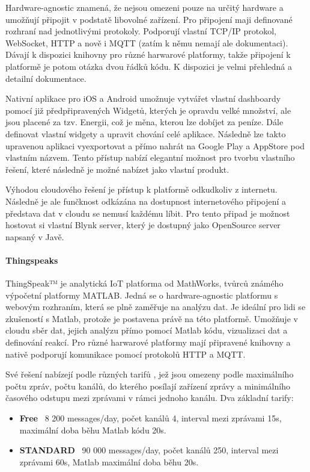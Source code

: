 Hardware-agnostic znamená, že nejsou omezeni pouze na určitý hardware a umožňují připojit v podstatě libovolné zařízení. Pro připojení maji definované rozhraní nad jednotlivými protokoly. Podporují vlastní TCP/IP protokol, WebSocket, HTTP a nově i MQTT (zatím k němu nemají ale dokumentaci). Dávají k dispozici knihovny pro různé harwarové platformy, takže připojení k platformě je potom otázka dvou řádků kódu. K dispozici je velmi přehledná a detailní dokumentace. \cite{blynk-doc}

Nativní aplikace pro iOS a Android umožnuje vytvářet vlastní dashboardy pomocí již předpřipravených Widgetů, kterých je opravdu velké množství, ale jsou placené za tzv. Energii, což je měna, kterou lze dobíjet za peníze. Dále definovat vlastní widgety a upravit chování celé aplikace. Následně lze takto upravenou aplikaci vyexportovat a přímo nahrát na Google Play a AppStore pod vlastním názvem. Tento přístup nabízí elegantní možnost pro tvorbu vlastního řešení, které následně je možné nabízet jako vlastní produkt. \cite{blynk}

Výhodou cloudového řešení je přístup k platformě odkudkoliv z internetu. Následně je ale funčknost odkázána na dostupnost internetového připojení a představa dat v cloudu se nemusí každému líbit. Pro tento připad je možnost hostovat si vlastní Blynk server, který je dostupný jako OpenSource server napsaný v Javě. \cite{blynk-server}

\paragraph{Thingspeaks}
ThingSpeak™ je analytická IoT platforma od MathWorks, tvůrců známého výpočetní platformy MATLAB. Jedná se o hardware-agnostic platformu s webovým rozhraním, která se plně zaměřuje na analýzu dat. Je ideální pro lidi se zkušeností s Matlab, protože je postavena právě na této platformě. Umožňuje v cloudu sběr dat, jejich analýzu přímo pomocí Matlab kódu, vizualizaci dat a definování reakcí. Pro různé harwarové platformy mají připravené knihovny a nativě podporují komunikace pomocí protokolů HTTP a MQTT. \cite{thingspeaks}

Své řešení nabízejí podle různých tarifů \cite{thingspeaks-pricing}, jež jsou omezeny podle maximálního počtu zpráv, počtu kanálů, do kterého posílají zařízení zprávy a minimálního časového odstupu mezi zprávami v rámci jednoho kanálu. Dva základní tarify:
\begin{itemize}
    \item \textbf{Free} ~8 200 messages/day, počet kanálů 4, interval mezi zprávami 15s, maximální doba běhu Matlab kódu 20s.
    \item \textbf{STANDARD} ~90 000 messages/day, počet kanálů 250, interval mezi zprávami 60s, Matlab maximální doba běhu 20s.
\end{itemize}

